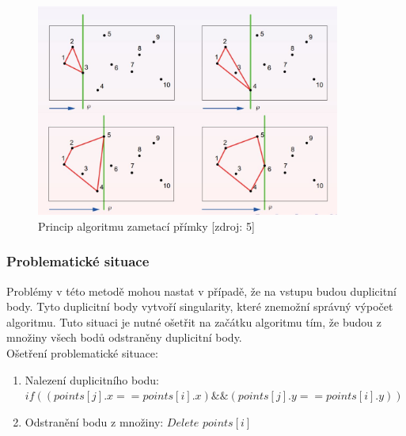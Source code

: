 \documentclass[a4paper, 12pt]{article}
\begin{document}
\begin{figure}[h!]
	\centering
	\includegraphics[width=10cm]{sweep_line.jpg}
	\caption{Princip algoritmu zametací přímky [zdroj: 5]}
\end{figure}

\subsubsection{Problematické situace}
Problémy v této metodě mohou nastat v případě, že na vstupu budou duplicitní body. Tyto duplicitní body vytvoří singularity, které znemožní správný výpočet algoritmu. Tuto situaci je nutné ošetřit na začátku algoritmu tím, že budou z množiny všech bodů odstraněny duplicitní body.\\

Ošetření problematické situace:
\begin{enumerate}
\item Nalezení duplicitního bodu:  $ if( (points[j].x == points[i].x) \&\& (points[j].y == points[i].y) )$ 
\item Odstranění bodu z množiny: $ Delete$ $ points[i]$
\end{enumerate}
\end{document}
